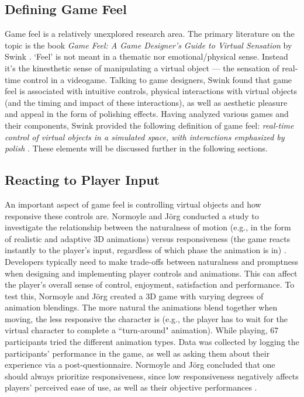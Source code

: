 
\subsection{Defining Game Feel} \label{define_GF}
Game feel is a relatively unexplored research area. The primary literature on the topic is the book \textit{Game Feel: A Game Designer's Guide to Virtual Sensation} by Swink \cite{swink}. `Feel' is not meant in a thematic nor emotional/physical sense. Instead it's the kinesthetic sense of manipulating a virtual object --- the sensation of real-time control in a videogame. Talking to game designers, Swink found that game feel is associated with intuitive controls, physical interactions with virtual objects (and the timing and impact of these interactions), as well as aesthetic pleasure and appeal in the form of polishing effects. Having analyzed various games and their components, Swink provided the following definition of game feel: \textit{real-time control of virtual objects in a simulated space, with interactions emphasized by polish} \cite{swink}. These elements will be discussed further in the following sections.

\subsection{Reacting to Player Input}
An important aspect of game feel is controlling virtual objects and how responsive these controls are. Normoyle and J\"{o}rg conducted a study to investigate the relationship between the naturalness of motion (e.g., in the form of realistic and adaptive 3D animations) versus responsiveness (the game reacts instantly to the player's input, regardless of which phase the animation is in) \cite{normoyle_trade-offs_2014}. Developers typically need to make trade-offs between naturalness and promptness when designing and implementing player controls and animations. This can affect the player's overall sense of control, enjoyment, satisfaction and performance. To test this, Normoyle and J\"{o}rg  created a 3D game with varying degrees of animation blendings. The more natural the animations blend together when moving, the less responsive the character is (e.g., the player has to wait for the virtual character to complete a ``turn-around" animation). While playing, 67 participants tried the different animation types.  Data was collected by logging the participants' performance in the game, as well as asking them about their experience via a post-questionnaire. Normoyle and J\"{o}rg concluded that one should always prioritize responsiveness, since low responsiveness negatively affects players' perceived ease of use, as well as their objective performances \cite{normoyle_trade-offs_2014}.

